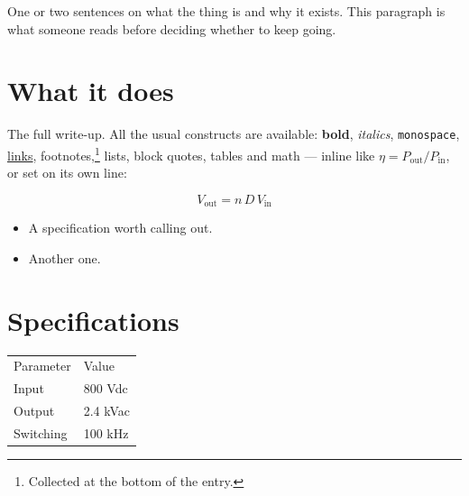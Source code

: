 

One or two sentences on what the thing is and why it exists. This paragraph is
what someone reads before deciding whether to keep going.

\section{What it does}

The full write-up. All the usual constructs are available: \textbf{bold},
\textit{italics}, \texttt{monospace}, \href{https://example.com}{links},
footnotes,\footnote{Collected at the bottom of the entry.} lists, block quotes,
tables and math --- inline like $\eta = P_{\mathrm{out}}/P_{\mathrm{in}}$, or
set on its own line:

\[
  V_{\mathrm{out}} = n \, D \, V_{\mathrm{in}}
\]

\begin{itemize}
  \item A specification worth calling out.
  \item Another one.
\end{itemize}

\section{Specifications}

\begin{tabular}{ll}
  Parameter & Value \\
  Input     & 800 Vdc \\
  Output    & 2.4 kVac \\
  Switching & 100 kHz \\
\end{tabular}



